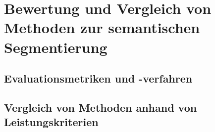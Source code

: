 \chapter{Bewertung und Vergleich von Methoden zur semantischen Segmentierung}
\section{Evaluationsmetriken und -verfahren}
\section{Vergleich von Methoden anhand von Leistungskriterien}
